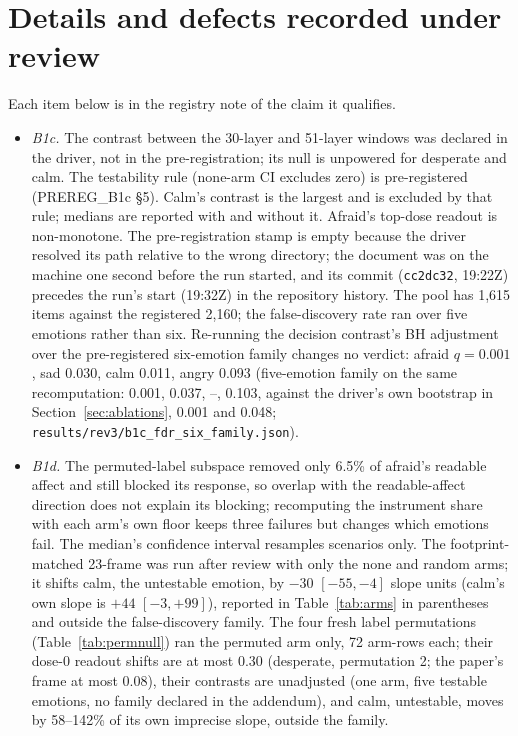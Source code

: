 \documentclass[11pt]{article}
\begin{document}
\section{Details and defects recorded under review}
\label{app:details}
Each item below is in the registry note of the claim it qualifies.
\begin{itemize}\setlength\itemsep{1pt}
\item \emph{B1c.} The contrast between the 30-layer and 51-layer windows was declared in the driver, not in the pre-registration; its null is unpowered for desperate and calm. The testability rule (none-arm CI excludes zero) is pre-registered (PREREG\_B1c \S5). Calm's contrast is the largest and is excluded by that rule; medians are reported with and without it. Afraid's top-dose readout is non-monotone. The pre-registration stamp is empty because the driver resolved its path relative to the wrong directory; the document was on the machine one second before the run started, and its commit (\texttt{cc2dc32}, 19:22Z) precedes the run's start (19:32Z) in the repository history. The pool has 1,615 items against the registered 2,160; the false-discovery rate ran over five emotions rather than six. Re-running the decision contrast's BH adjustment over the pre-registered six-emotion family changes no verdict: afraid $q=0.001$, sad 0.030, calm 0.011, angry 0.093 (five-emotion family on the same recomputation: 0.001, 0.037, --, 0.103, against the driver's own bootstrap in Section~\ref{sec:ablations}, 0.001 and 0.048; \texttt{results/rev3/b1c\_fdr\_six\_family.json}).
\item \emph{B1d.} The permuted-label subspace removed only 6.5\% of afraid's readable affect and still blocked its response, so overlap with the readable-affect direction does not explain its blocking; recomputing the instrument share with each arm's own floor keeps three failures but changes which emotions fail. The median's confidence interval resamples scenarios only. The footprint-matched 23-frame was run after review with only the none and random arms; it shifts calm, the untestable emotion, by $-30$ $[-55, -4]$ slope units (calm's own slope is $+44$ $[-3, +99]$), reported in Table~\ref{tab:arms} in parentheses and outside the false-discovery family. The four fresh label permutations (Table~\ref{tab:permnull}) ran the permuted arm only, 72 arm-rows each; their dose-0 readout shifts are at most 0.30 (desperate, permutation 2; the paper's frame at most 0.08), their contrasts are unadjusted (one arm, five testable emotions, no family declared in the addendum), and calm, untestable, moves by 58--142\% of its own imprecise slope, outside the family.

\end{itemize}
\end{document}
